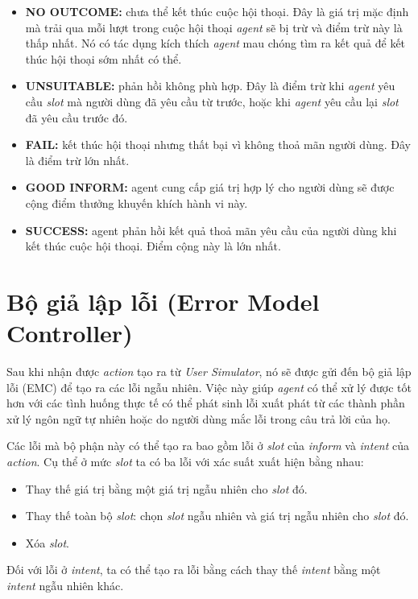 \begin{itemize}
    \item \textbf{NO OUTCOME:} chưa thể kết thúc cuộc hội thoại.
    Đây là giá trị mặc định mà trải qua mỗi lượt trong cuộc hội thoại
    \textit{agent} sẽ bị trừ và điểm trừ này là thấp nhất.
    Nó có tác dụng kích thích \textit{agent} mau chóng tìm ra
    kết quả để kết thúc hội thoại sớm nhất có thể.
    \item \textbf{UNSUITABLE:} phản hồi không phù hợp. Đây là điểm trừ
    khi \textit{agent} yêu cầu \textit{slot} mà người dùng đã yêu cầu
    từ trước, hoặc khi \textit{agent} yêu cầu lại \textit{slot}
    đã yêu cầu trước đó.
    \item \textbf{FAIL:} kết thúc hội thoại nhưng thất bại vì
    không thoả mãn người dùng. Đây là điểm trừ lớn nhất.
    \item \textbf{GOOD INFORM:} agent cung cấp giá trị hợp lý cho
    người dùng sẽ được cộng điểm thưởng khuyến khích hành vi này.
    \item \textbf{SUCCESS:} agent phản hồi kết quả thoả mãn yêu cầu
    của người dùng khi kết thúc cuộc hội thoại.
    Điểm cộng này là lớn nhất.
\end{itemize}

\section{Bộ giả lập lỗi (Error Model Controller)}
Sau khi nhận được \textit{action} tạo ra từ \textit{User Simulator},
nó sẽ được gửi đến bộ giả lập lỗi (EMC) để tạo ra các lỗi ngẫu nhiên.
Việc này giúp \textit{agent} có thể xử lý được tốt hơn với các
tình huống thực tế có thể phát sinh lỗi xuất phát từ các thành phần
xử lý ngôn ngữ tự nhiên hoặc do người dùng mắc lỗi trong câu trả lời
của họ.

Các lỗi mà bộ phận này có thể tạo ra bao gồm lỗi ở \textit{slot}
của \textit{inform} và \textit{intent} của \textit{action}.
Cụ thể ở mức \textit{slot} ta có ba lỗi với xác suất xuất hiện
bằng nhau:

\begin{itemize}
    \item Thay thế giá trị bằng một giá trị ngẫu nhiên cho
    \textit{slot} đó.
    \item Thay thế toàn bộ \textit{slot}: chọn \textit{slot}
    ngẫu nhiên và giá trị ngẫu nhiên cho \textit{slot} đó.
    \item Xóa \textit{slot}.
\end{itemize}

Đối với lỗi ở \textit{intent}, ta có thể tạo ra lỗi bằng cách
thay thế \textit{intent} bằng một \textit{intent} ngẫu nhiên khác.
